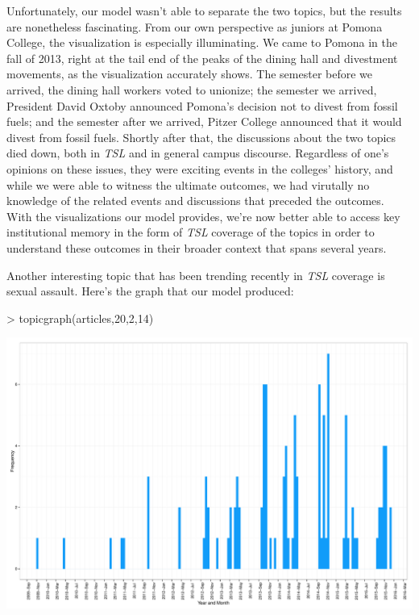\documentclass[a4paper]{article}
\begin{document}
Unfortunately, our model wasn't able to separate the two topics, but the results are nonetheless fascinating. From our own perspective as juniors at Pomona College, the visualization is especially illuminating. We came to Pomona in the fall of 2013, right at the tail end of the peaks of the dining hall and divestment movements, as the visualization accurately shows. The semester before we arrived, the dining hall workers voted to unionize; the semester we arrived, President David Oxtoby announced Pomona's decision not to divest from fossil fuels; and the semester after we arrived, Pitzer College announced that it would divest from fossil fuels. Shortly after that, the discussions about the two topics died down, both in \textit{TSL} and in general campus discourse. Regardless of one's opinions on these issues, they were exciting events in the colleges' history, and while we were able to witness the ultimate outcomes, we had virutally no knowledge of the related events and discussions that preceded the outcomes. With the visualizations our model provides, we're now better able to access key institutional memory in the form of \textit{TSL} coverage of the topics in order to understand these outcomes in their broader context that spans several years.

Another interesting topic that has been trending recently in \textit{TSL} coverage is sexual assault. Here's the graph that our model produced:

\begin{Schunk}
\begin{Sinput}
> topicgraph(articles,20,2,14)
\end{Sinput}
\end{Schunk}
\includegraphics{FinalProject-008}
\end{document}
